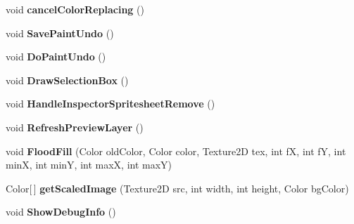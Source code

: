 \begin{DoxyCompactItemize}
\item 
\hypertarget{class_rage_pixel_sprite_editor_a4dfeacf83cb129326ef074521454ecfa}{void {\bfseries cancel\-Color\-Replacing} ()}\label{class_rage_pixel_sprite_editor_a4dfeacf83cb129326ef074521454ecfa}

\item 
\hypertarget{class_rage_pixel_sprite_editor_a3a71bf8341e51b17fd396d7c8a25fac7}{void {\bfseries Save\-Paint\-Undo} ()}\label{class_rage_pixel_sprite_editor_a3a71bf8341e51b17fd396d7c8a25fac7}

\item 
\hypertarget{class_rage_pixel_sprite_editor_ad4cb484e17cb477049427d13790c21bb}{void {\bfseries Do\-Paint\-Undo} ()}\label{class_rage_pixel_sprite_editor_ad4cb484e17cb477049427d13790c21bb}

\item 
\hypertarget{class_rage_pixel_sprite_editor_a3a544568283528ebba2d8325e9b343c0}{void {\bfseries Draw\-Selection\-Box} ()}\label{class_rage_pixel_sprite_editor_a3a544568283528ebba2d8325e9b343c0}

\item 
\hypertarget{class_rage_pixel_sprite_editor_a93e781f61798e4e66e95550acd3f17b9}{void {\bfseries Handle\-Inspector\-Spritesheet\-Remove} ()}\label{class_rage_pixel_sprite_editor_a93e781f61798e4e66e95550acd3f17b9}

\item 
\hypertarget{class_rage_pixel_sprite_editor_a85bf0f47bd9e6a6c7d7488c7046d8dc5}{void {\bfseries Refresh\-Preview\-Layer} ()}\label{class_rage_pixel_sprite_editor_a85bf0f47bd9e6a6c7d7488c7046d8dc5}

\item 
\hypertarget{class_rage_pixel_sprite_editor_a2669880346c608f99177088e63145ac2}{void {\bfseries Flood\-Fill} (Color old\-Color, Color color, Texture2\-D tex, int f\-X, int f\-Y, int min\-X, int min\-Y, int max\-X, int max\-Y)}\label{class_rage_pixel_sprite_editor_a2669880346c608f99177088e63145ac2}

\item 
\hypertarget{class_rage_pixel_sprite_editor_a0c5f3d9da26f922911d57bd3bdb86c14}{Color\mbox{[}$\,$\mbox{]} {\bfseries get\-Scaled\-Image} (Texture2\-D src, int width, int height, Color bg\-Color)}\label{class_rage_pixel_sprite_editor_a0c5f3d9da26f922911d57bd3bdb86c14}

\item 
\hypertarget{class_rage_pixel_sprite_editor_a5ba80f510b8538d1d7a49ef7dd2221a9}{void {\bfseries Show\-Debug\-Info} ()}\label{class_rage_pixel_sprite_editor_a5ba80f510b8538d1d7a49ef7dd2221a9}


\end{DoxyCompactItemize}
